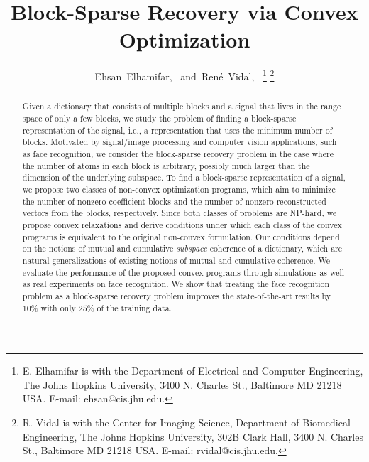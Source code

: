\documentclass[10pt,twocolumn,twoside] {IEEEtran}
\begin{document}
\title{Block-Sparse Recovery via Convex Optimization}

\author{Ehsan~Elhamifar,~
        and~Ren\'e~Vidal,~
\thanks{E. Elhamifar is with the Department
of Electrical and Computer Engineering, The Johns Hopkins University, 3400 N.
Charles St., Baltimore MD 21218 USA. E-mail: ehsan@cis.jhu.edu. 
}
\thanks{R. Vidal is with the Center for Imaging Science, Department of Biomedical
Engineering, The Johns Hopkins University, 302B Clark Hall, 3400 N.
Charles St., Baltimore MD 21218 USA. E-mail: rvidal@cis.jhu.edu.}
}

\maketitle

\vspace{-1mm}

\begin{abstract}
Given a dictionary that consists of multiple blocks and a signal that lives in the range space of only a few blocks, we study the problem of finding a block-sparse representation of the signal, i.e., a representation that uses the minimum number of blocks. Motivated by signal/image processing and computer vision applications, such as face recognition, we consider the block-sparse recovery problem in the case where the number of atoms in each block is arbitrary, possibly much larger than the dimension of the underlying subspace. To find a block-sparse representation of a signal, we propose two classes of non-convex optimization programs, which aim to minimize the number of nonzero coefficient blocks and the number of nonzero reconstructed vectors from the blocks, respectively. Since both classes of problems are NP-hard, we propose convex relaxations and derive conditions under which each class of the convex programs is equivalent to the original non-convex formulation. Our conditions depend on the notions of mutual and cumulative \emph{subspace} coherence of a dictionary, which are natural generalizations of existing notions of mutual and cumulative coherence. We evaluate the performance of the proposed convex programs through simulations as well as real experiments on face recognition. We show that treating the face recognition problem as a block-sparse recovery problem improves the state-of-the-art results by $10\%$ with only $25\%$ of the training data.

\end{abstract}
\end{document}
